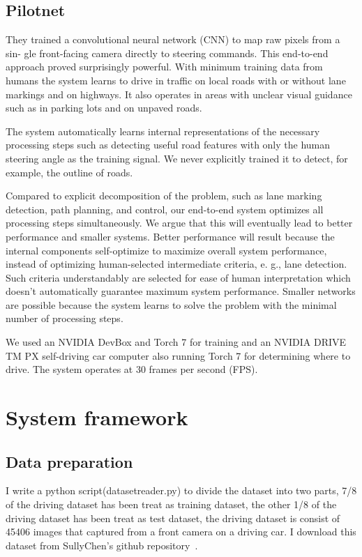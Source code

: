 \documentclass[conference]{IEEEtran}
\begin{document}
\subsection{Pilotnet}
They trained a convolutional neural network (CNN) to map raw pixels from a sin-
gle front-facing camera directly to steering commands. This end-to-end approach
proved surprisingly powerful. With minimum training data from humans the system learns to drive in traffic on local roads with or without lane markings and on
highways. It also operates in areas with unclear visual guidance such as in parking
lots and on unpaved roads.\par
The system automatically learns internal representations of the necessary processing steps such as detecting useful road features with only the human steering angle
as the training signal. We never explicitly trained it to detect, for example, the outline of roads.\par
Compared to explicit decomposition of the problem, such as lane marking detection, path planning, and control, our end-to-end system optimizes all processing
steps simultaneously. We argue that this will eventually lead to better performance and smaller systems. Better performance will result because the internal
components self-optimize to maximize overall system performance, instead of optimizing human-selected intermediate criteria, e. g., lane detection. Such criteria
understandably are selected for ease of human interpretation which doesn’t automatically guarantee maximum system performance. Smaller networks are possible because the system learns to solve the problem with the minimal number of processing steps.\par
We used an NVIDIA DevBox and Torch 7 for training and an NVIDIA
DRIVE TM PX self-driving car computer also running Torch 7 for determining
where to drive. The system operates at 30 frames per second (FPS).

\section{System framework}

\subsection{Data preparation}
I write a python script(datasetreader.py) to divide the dataset into two parts, 7/8 of the driving dataset has been treat as training dataset, the other 1/8 of the driving dataset has been treat as test dataset, the driving dataset is consist of 45406 images that captured from a front camera on a driving car. I download this dataset from SullyChen's github repository~\cite{b3}.
\end{document}
